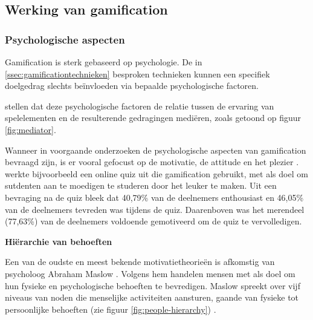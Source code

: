 \subsection{Werking van gamification}

\subsubsection{Psychologische aspecten}
Gamification is sterk gebaseerd op psychologie. 
De in \ref{ssec:gamificationtechnieken} besproken technieken kunnen een specifiek doelgedrag slechts beïnvloeden via bepaalde psychologische factoren.

\textcite{Landers2011} stellen dat deze psychologische factoren de relatie tussen de ervaring van spelelementen en de resulterende gedragingen mediëren, zoals getoond op figuur \ref{fig:mediator}.

Wanneer in voorgaande onderzoeken de psychologische aspecten van gamification bevraagd zijn, is er vooral gefocust op de motivatie, de attitude en het plezier \autocite{Hamari2014}. \textcite{Cheong2013} werkte bijvoorbeeld een online quiz uit die gamification gebruikt, met als doel om sutdenten aan te moedigen te studeren door het leuker te maken. Uit een bevraging  na de quiz bleek dat 40,79\% van de deelnemers enthousiast en 46,05\% van de deelnemers tevreden was tijdens de quiz. Daarenboven was het merendeel (77,63\%) van de deelnemers voldoende gemotiveerd om de quiz te vervolledigen.

\textbf{Hiërarchie van behoeften}

Een van de oudste en meest bekende motivatietheorieën is afkomstig van psycholoog Abraham Maslow \autocite{Richter2014}. Volgens hem handelen mensen met als doel om hun fysieke en psychologische behoeften te bevredigen. Maslow spreekt over vijf niveaus van noden die menselijke activiteiten aansturen, gaande van fysieke tot persoonlijke behoeften (zie figuur \ref{fig:people-hierarchy}) \autocite{Lilienfeld2014}.

